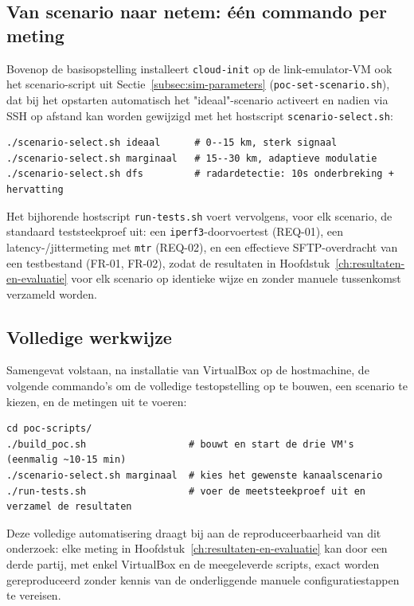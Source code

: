 \subsection{Van scenario naar netem: één commando per meting}%
\label{subsec:automatisering-scenario}

Bovenop de basisopstelling installeert \texttt{cloud-init} op de link-emulator-VM ook
het scenario-script uit Sectie~\ref{subsec:sim-parameters}
(\texttt{poc-set-scenario.sh}), dat bij het opstarten automatisch het "ideaal"-scenario
activeert en nadien via SSH op afstand kan worden gewijzigd met het hostscript
\texttt{scenario-select.sh}:

\begin{listing}[h]
\begin{verbatim}
./scenario-select.sh ideaal      # 0--15 km, sterk signaal
./scenario-select.sh marginaal   # 15--30 km, adaptieve modulatie
./scenario-select.sh dfs         # radardetectie: 10s onderbreking + hervatting
\end{verbatim}
\caption[Scenario wisselen vanaf de host]{Het hostscript \texttt{scenario-select.sh}
schakelt op afstand tussen de drie kanaalscenario's uit
Figuur~\ref{fig:airmax-scenarios}, zonder dat de server- of client-VM herstart moeten
worden.}
\label{lst:scenario-select}
\end{listing}

Het bijhorende hostscript \texttt{run-tests.sh} voert vervolgens, voor elk scenario, de
standaard teststeekproef uit: een \texttt{iperf3}-doorvoertest (REQ-01), een
latency-/jittermeting met \texttt{mtr} (REQ-02), en een effectieve SFTP-overdracht van
een testbestand (FR-01, FR-02), zodat de resultaten in
Hoofdstuk~\ref{ch:resultaten-en-evaluatie} voor elk scenario op identieke wijze en
zonder manuele tussenkomst verzameld worden.

\subsection{Volledige werkwijze}%
\label{subsec:automatisering-workflow}

Samengevat volstaan, na installatie van VirtualBox op de hostmachine, de volgende
commando's om de volledige testopstelling op te bouwen, een scenario te kiezen, en de
metingen uit te voeren:

\begin{listing}[h]
\begin{verbatim}
cd poc-scripts/
./build_poc.sh                  # bouwt en start de drie VM's (eenmalig ~10-15 min)
./scenario-select.sh marginaal  # kies het gewenste kanaalscenario
./run-tests.sh                  # voer de meetsteekproef uit en verzamel de resultaten
\end{verbatim}
\caption[Volledige workflow]{De volledige workflow van installatie tot meting, herleid
tot drie commando's.}
\label{lst:workflow-volledig}
\end{listing}

Deze volledige automatisering draagt bij aan de reproduceerbaarheid van dit onderzoek:
elke meting in Hoofdstuk~\ref{ch:resultaten-en-evaluatie} kan door een derde partij,
met enkel VirtualBox en de meegeleverde scripts, exact worden gereproduceerd zonder
kennis van de onderliggende manuele configuratiestappen te vereisen.
